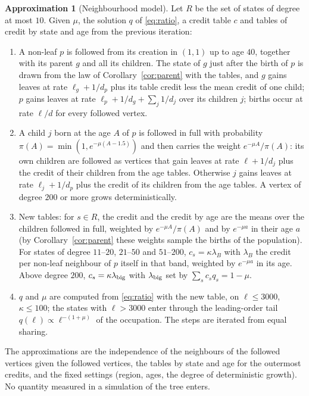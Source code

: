 \documentclass[11pt]{article}
\theoremstyle{plain}
\theoremstyle{definition}
\newtheorem{approximation}[theorem]{Approximation}
\theoremstyle{remark}
\begin{document}
\begin{approximation}[Neighbourhood model]\label{app:nb}
Let $R$ be the set of states of degree at most $10$. Given $\mu$, the solution $q$ of \eqref{eq:ratio}, a credit table $c$ and tables of credit by state and age from the previous iteration:
\begin{enumerate}
\item A non-leaf $p$ is followed from its creation in $(1,1)$ up to age $40$, together with its parent $g$ and all its children. The state of $g$ just after the birth of $p$ is drawn from the law of Corollary~\ref{cor:parent} with the tables, and $g$ gains leaves at rate $\ell_g+1/d_p$ plus its table credit less the mean credit of one child; $p$ gains leaves at rate $\ell_p+1/d_g+\sum_j1/d_j$ over its children $j$; births occur at rate $\ell/d$ for every followed vertex.
\item A child $j$ born at the age $A$ of $p$ is followed in full with probability $\pi(A)=\min(1,e^{-\mu(A-1.5)})$ and then carries the weight $e^{-\mu A}/\pi(A)$: its own children are followed as vertices that gain leaves at rate $\ell+1/d_j$ plus the credit of their children from the age tables. Otherwise $j$ gains leaves at rate $\ell_j+1/d_p$ plus the credit of its children from the age tables. A vertex of degree $200$ or more grows deterministically.
\item New tables: for $s\in R$, the credit and the credit by age are the means over the children followed in full, weighted by $e^{-\mu A}/\pi(A)$ and by $e^{-\mu a}$ in their age $a$ (by Corollary~\ref{cor:parent} these weights sample the births of the population). For states of degree $11$--$20$, $21$--$50$ and $51$--$200$, $c_s=\kappa\lambda_B$ with $\lambda_B$ the credit per non-leaf neighbour of $p$ itself in that band, weighted by $e^{-\mu a}$ in its age. Above degree $200$, $c_s=\kappa\lambda_{\rm big}$ with $\lambda_{\rm big}$ set by $\sum_sc_sq_s=1-\mu$.
\item $q$ and $\mu$ are computed from \eqref{eq:ratio} with the new table, on $\ell\le3000$, $\kappa\le100$; the states with $\ell>3000$ enter through the leading-order tail $q(\ell)\propto\ell^{-(1+\mu)}$ of the occupation. The steps are iterated from equal sharing.
\end{enumerate}
\end{approximation}

The approximations are the independence of the neighbours of the followed vertices given the followed vertices, the tables by state and age for the outermost credits, and the fixed settings (region, ages, the degree of deterministic growth). No quantity measured in a simulation of the tree enters.
\end{document}
